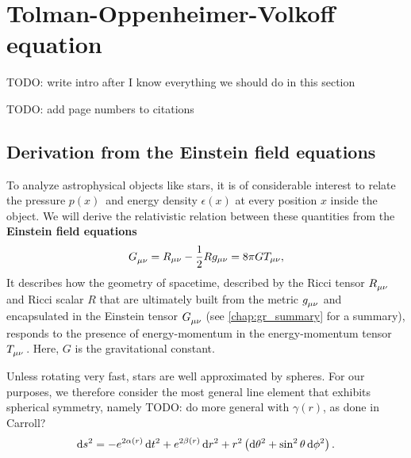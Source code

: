\chapter{Tolman-Oppenheimer-Volkoff equation}

TODO: write intro after I know everything we should do in this section

TODO: add page numbers to citations

\section{Derivation from the Einstein field equations}
\label{sec:tov}

To analyze astrophysical objects like stars, it is of considerable interest to relate the pressure $p(x)$ and energy density $\epsilon(x)$ at every position $x$ inside the object.
We will derive the relativistic relation between these quantities from the \textbf{Einstein field equations} \cite[equation 4.44]{ref:carroll}
\begin{equation}
	G\indices{_\mu_\nu} = R_{\mu \nu} - \frac{1}{2} R g_{\mu \nu} = 8 \pi G T_{\mu \nu} ,
	\label{eq:einstein}
\end{equation}
It describes how the geometry of spacetime, described by the Ricci tensor $R\indices{_\mu_\nu}$ and Ricci scalar $R$ that are ultimately built from the metric $g\indices{_\mu_\nu}$ and encapsulated in the Einstein tensor $G\indices{_\mu_\nu}$ (see \cref{chap:gr_summary} for a summary), responds to the presence of energy-momentum in the energy-momentum tensor $T\indices{_\mu_\nu}$.
Here, $G$ is the gravitational constant.

Unless rotating very fast, stars are well approximated by spheres.
For our purposes, we therefore consider the most general line element that exhibits spherical symmetry, namely \cite[§ 94-95]{ref:tolman}
TODO: do more general with $\gamma(r)$, as done in Carroll?
\begin{equation}
	\mathop{}\!\mathrm{d} s^2 = -e^{2 \alpha(r)} \mathop{}\!\mathrm{d} t^2 + e^{2 \beta(r)} \mathop{}\!\mathrm{d} r^2 + r^2 \left( \mathop{}\!\mathrm{d} \theta^2 + \sin^2 \theta \mathop{}\!\mathrm{d} \phi^2 \right) .
\end{equation}

